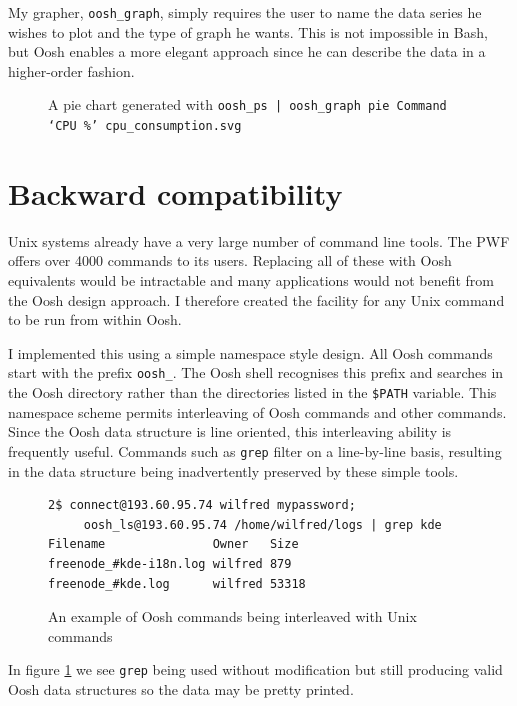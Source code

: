 \documentclass[12pt,twoside,notitlepage]{report}
\begin{document}
My grapher, {\tt oosh\_graph}, simply requires the user to name the
data series he wishes to plot and the type of graph he wants. This is
not impossible in Bash, but Oosh enables a more elegant approach since
he can describe the data in a higher-order fashion.

\begin{figure}[h]
  \caption{A pie chart generated with {\tt oosh\_ps | oosh\_graph pie Command `CPU \%' cpu\_consumption.svg}}
  \centering
\end{figure}

\section{Backward compatibility}

Unix systems already have a very large number of command line
tools. The PWF offers over 4000 commands to its users. Replacing all of these
with Oosh equivalents would be intractable and many applications would
not benefit from the Oosh design approach. I therefore created the
facility for any Unix command to be run from within Oosh. 

I implemented this using a simple namespace style design. All Oosh
commands start with the prefix {\tt oosh\_}. The Oosh shell recognises
this prefix and searches in the Oosh directory rather than the
directories listed in the {\tt \$PATH} variable. This namespace scheme
permits interleaving of Oosh commands and other commands. Since the
Oosh data structure is line oriented, this interleaving ability is
frequently useful. Commands such as {\tt grep} filter on a
line-by-line basis, resulting in the data structure being
inadvertently preserved by these simple tools.

\begin{figure}[h]
\label{grepexample}
\caption{An example of Oosh commands being interleaved with Unix commands}
\begin{verbatim}
2$ connect@193.60.95.74 wilfred mypassword;
     oosh_ls@193.60.95.74 /home/wilfred/logs | grep kde
Filename               Owner   Size
freenode_#kde-i18n.log wilfred 879
freenode_#kde.log      wilfred 53318
\end{verbatim}
\end{figure}

In figure \ref{grepexample} we see {\tt grep} being used without
modification but still producing valid Oosh data structures so the
data may be pretty printed.
\end{document}
